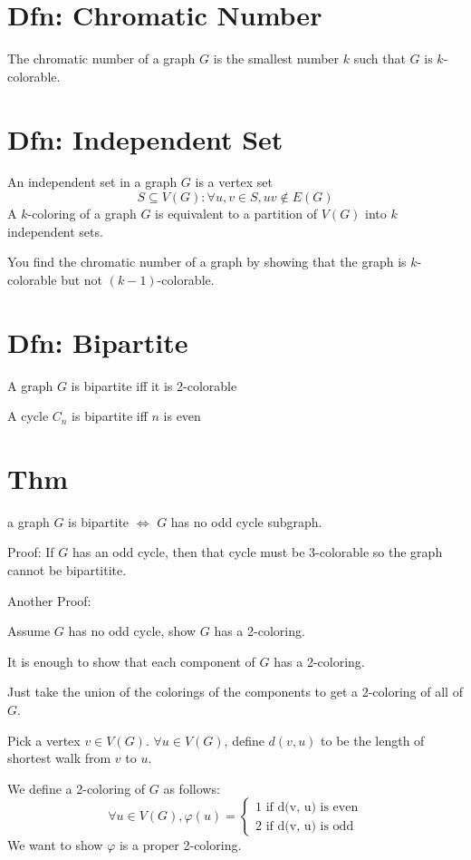 \documentclass{report}
\begin{document}
\section{Dfn: Chromatic Number}
The chromatic number of a graph $G$ is the smallest number $k$ such that $G$ is $k$-colorable.

\section{Dfn: Independent Set} 
An independent set in a graph $G$ is a vertex set 
\[
S \subseteq V(G): \forall u, v \in S, uv \notin E(G)
\]
A $k$-coloring of a graph $G$ is equivalent to a partition of $V(G)$ into $k$ independent sets.

You find the chromatic number of a graph by showing that the graph is $k$-colorable but not $(k-1)$-colorable.

\section{Dfn: Bipartite}
A graph $G$ is bipartite iff it is 2-colorable

A cycle $C_n$ is bipartite iff $n$ is even

\section{Thm}
a graph $G$ is bipartite $\iff$ $G$ has no odd cycle subgraph.

Proof:
If $G$ has an odd cycle, then that cycle must be 3-colorable so the graph cannot be bipartitite.

Another Proof:

Assume $G$ has no odd cycle, show $G$ has a 2-coloring.

It is enough to show that each component of $G$ has a 2-coloring. 

Just take the union of the colorings of the components to get a 2-coloring of all of $G$. 

Pick a vertex $v \in V(G)$. $\forall u \in V(G)$, define $d(v, u)$ to be the length of shortest walk from $v$ to $u$. 

We define a 2-coloring of $G$ as follows:
\[
\forall u \in V(G), \varphi (u) 
= 
\begin{cases}
 1 \textrm{ if d(v, u) is even} \\ 
 2 \textrm{ if d(v, u) is odd} \end{cases}
\]
We want to show $\varphi$ is a proper 2-coloring.
\end{document}
